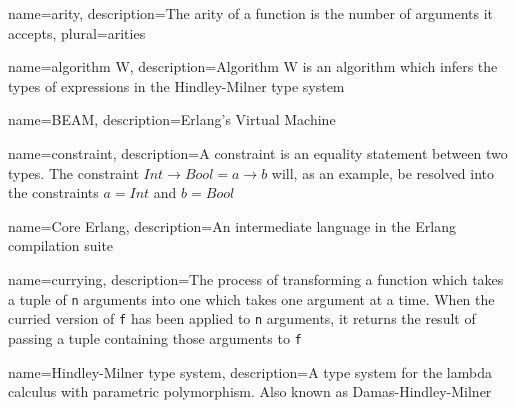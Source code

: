 
%


%




{ name={arity},
  description={The arity of a function is the number of arguments it accepts},
  plural={arities}
}

{ name={algorithm W},
  description={Algorithm W is an algorithm which infers the types of expressions in the Hindley-Milner type system}
}

{ name={BEAM},
  description={Erlang's Virtual Machine}
}


{ name={constraint},
  description={A constraint is an equality statement between two types. The constraint $Int \to Bool = a \to b$ will, as an example, be resolved into the constraints $a = Int$ and $b = Bool$}
}

{ name={Core Erlang},
  description={An intermediate language in the Erlang compilation suite}
}

{ name={currying},
  description={The process of transforming a function which takes a tuple of \texttt{n} arguments into one which takes one argument at a time. When the curried version of \texttt{f} has been applied to \texttt{n} arguments, it returns the result of passing a tuple containing those arguments to \texttt{f}}
}

{ name={Hindley-Milner type system},
  description={A type system for the lambda calculus with parametric polymorphism. Also known as Damas-Hindley-Milner}
}


